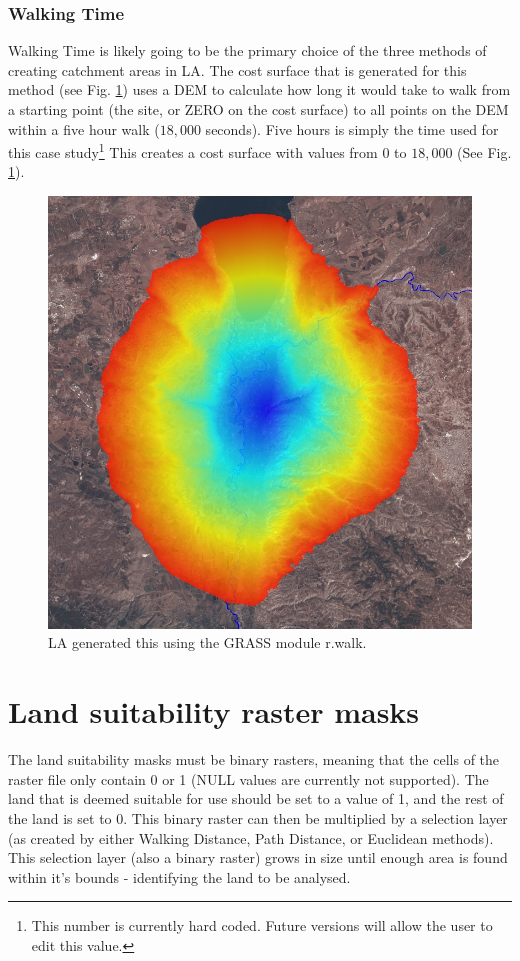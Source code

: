     \subsubsection{Walking Time}
      Walking Time is likely going to be the primary choice of the three methods of
      creating catchment areas in LA.  The cost surface that is
      generated for this method (see Fig. \ref{fig:rwalk}) uses a DEM to calculate
      how long it would take to walk from a starting point (the site, or ZERO on
      the cost surface) to all points on the DEM within a five hour walk ($18,000$
      seconds). Five hours is simply the time used for this case
      study\footnote{This number is currently hard coded. Future versions will
      allow the user to edit this value.} This creates a cost surface with values
      from $0$ to $18,000$ (See Fig. \ref{fig:rwalk}).  

\begin{figure}[htbp] 
  \includegraphics[scale=0.29]{./images/rwalkShuna.jpg}
  \caption{\label{fig:rwalk}LA generated this using the GRASS module r.walk.}
\end{figure}

\section{Land suitability raster masks} 
  The land suitability masks must be binary rasters, meaning that the cells of
  the raster file only contain 0 or 1 (NULL values are currently not supported).
  The land that is deemed suitable for use should be set to a value of 1, and the
  rest of the land is set to 0.  This binary raster  can then be multiplied by a
  selection layer (as created by either Walking Distance, Path Distance,
  or Euclidean methods).  This selection layer (also a binary raster) grows in
  size until enough area is
  found within it's bounds - identifying the land to be analysed.
  
